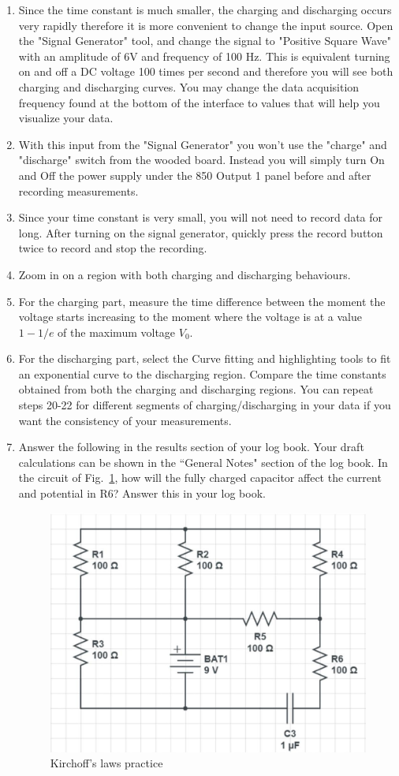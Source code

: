 \documentclass[12pt]{report}
\begin{document}
\begin{enumerate}
\item Since the time constant is much smaller, the charging and discharging occurs very rapidly therefore it is more convenient to change the input source. Open the "Signal Generator" tool, and change the signal to "Positive Square Wave" with an amplitude of 6V and frequency of 100 Hz. This is equivalent turning on and off a DC voltage 100 times per second and therefore you will see both charging and discharging curves. You may change the data acquisition frequency found at the bottom of the interface to values that will help you visualize your data.
\item With this input from the "Signal Generator" you won't use the "charge" and "discharge" switch from the wooded board. Instead you will simply turn On and Off the power supply under the 850 Output 1 panel before and after recording measurements.
\item Since your time constant is very small, you will not need to record data for long. After turning on the signal generator, quickly press the record button twice to record and stop the recording.
\item Zoom in on a region with both charging and discharging behaviours.
\item For the charging part, measure the time difference between the moment the voltage starts increasing to the moment where the voltage is at a value $1-1/e$ of the maximum voltage $V_0$.
\item For the discharging part, select the Curve fitting and highlighting tools to fit an exponential curve to the discharging region. Compare the time constants obtained from both the charging and discharging regions. You can repeat steps 20-22 for different segments of charging/discharging in your data if you want the consistency of your measurements.
\item Answer the following in the results section of your log book. Your draft calculations can be shown in the ``General Notes" section of the log book. In the circuit of Fig.~\ref{Fig:lab2-session1-Rpractice}, how will the fully charged capacitor affect the current and potential in R6? Answer this in your log book.
\begin{figure}[h]
\centering
\includegraphics[width=0.6\linewidth]{lab2-session1-Rpractice}
\caption{Kirchoff's laws practice}
\label{Fig:lab2-session1-Rpractice}
\end{figure}


\end{enumerate}
\end{document}
